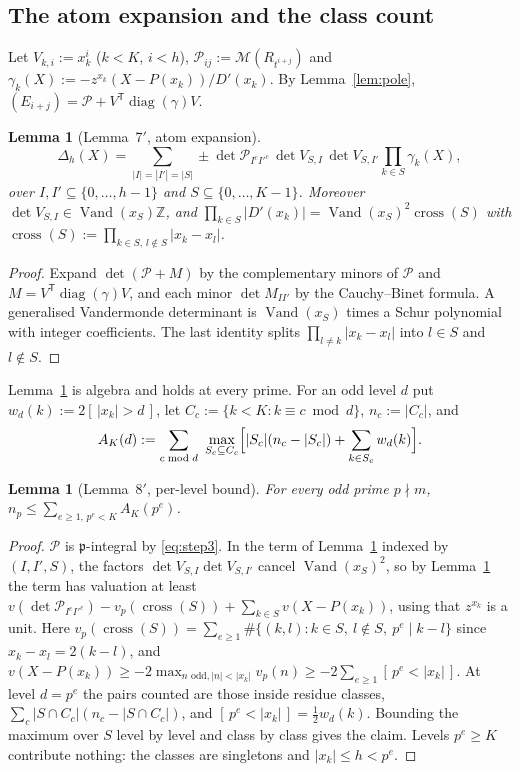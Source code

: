 \documentclass[11pt]{amsart}
\newtheorem{lemma}[theorem]{Lemma}
\theoremstyle{definition}
\theoremstyle{remark}
\numberwithin{equation}{section}
\newcommand{\ZZ}{\mathbb{Z}}
\newcommand{\cM}{\mathcal{M}}
\newcommand{\cP}{\mathcal{P}}
\newcommand{\fp}{\mathfrak{p}}
\newcommand{\ind}[1]{[\,#1\,]}
\newcommand{\cross}{\operatorname{cross}}
\newcommand{\Vand}{\operatorname{Vand}}
\begin{document}
\subsection{The atom expansion and the class count}\label{sec:atom}
Let $V_{k,i}:=x_k^i$ ($k<K$, $i<h$), $\cP_{ij}:=\cM(R_{t^{i+j}})$ and $\gamma_k(X):=-z^{x_k}(X-P(x_k))/D'(x_k)$. By
Lemma~\ref{lem:pole}, $(E_{i+j})=\cP+V^{\mathsf T}\operatorname{diag}(\gamma)V$.

\begin{lemma}[Lemma~7$'$, atom expansion]\label{lem:atom}
\[
  \Delta_h(X)=\sum_{|I|=|I'|=|S|}\pm\det\cP_{I^cI'^c}\,\det V_{S,I}\,\det V_{S,I'}\prod_{k\in S}\gamma_k(X),
\]
over $I,I'\subseteq\{0,\dots,h-1\}$ and $S\subseteq\{0,\dots,K-1\}$. Moreover $\det V_{S,I}\in\Vand(x_S)\ZZ$, and
$\prod_{k\in S}|D'(x_k)|=\Vand(x_S)^2\cross(S)$ with $\cross(S):=\prod_{k\in S,\,l\notin S}|x_k-x_l|$.
\end{lemma}

\begin{proof}
Expand $\det(\cP+M)$ by the complementary minors of $\cP$ and $M=V^{\mathsf T}\operatorname{diag}(\gamma)V$, and each minor
$\det M_{II'}$ by the Cauchy--Binet formula. A generalised Vandermonde determinant is $\Vand(x_S)$ times a Schur
polynomial with integer coefficients. The last identity splits $\prod_{l\ne k}|x_k-x_l|$ into $l\in S$ and $l\notin S$.
\end{proof}

Lemma~\ref{lem:atom} is algebra and holds at every prime. For an odd level $d$ put $w_d(k):=2\ind{|x_k|>d}$, let
$C_c:=\{k<K:k\equiv c\bmod d\}$, $n_c:=|C_c|$, and
\[
  A_K(d):=\sum_{c\bmod d}\ \max_{S_c\subseteq C_c}\Bigl[|S_c|(n_c-|S_c|)+\sum_{k\in S_c}w_d(k)\Bigr].
\]

\begin{lemma}[Lemma~8$'$, per-level bound]\label{lem:eight}
For every odd prime $p\nmid m$, $n_p\le\sum_{e\ge1,\,p^e<K}A_K(p^e)$.
\end{lemma}

\begin{proof}
$\cP$ is $\fp$-integral by \eqref{eq:step3}. In the term of Lemma~\ref{lem:atom} indexed by $(I,I',S)$, the factors
$\det V_{S,I}\det V_{S,I'}$ cancel $\Vand(x_S)^2$, so by Lemma~\ref{lem:atom} the term has valuation at least
$v(\det\cP_{I^cI'^c})-v_p(\cross(S))+\sum_{k\in S}v(X-P(x_k))$, using that $z^{x_k}$ is a unit. Here
$v_p(\cross(S))=\sum_{e\ge1}\#\{(k,l):k\in S,\ l\notin S,\ p^e\mid k-l\}$ since $x_k-x_l=2(k-l)$, and
$v(X-P(x_k))\ge-2\max_{n\text{ odd},|n|<|x_k|}v_p(n)\ge-2\sum_{e\ge1}\ind{p^e<|x_k|}$. At level $d=p^e$ the pairs
counted are those inside residue classes, $\sum_c|S\cap C_c|(n_c-|S\cap C_c|)$, and $\ind{p^e<|x_k|}=\frac12w_d(k)$.
Bounding the maximum over $S$ level by level and class by class gives the claim. Levels $p^e\ge K$ contribute nothing:
the classes are singletons and $|x_k|\le h<p^e$.
\end{proof}
\end{document}
